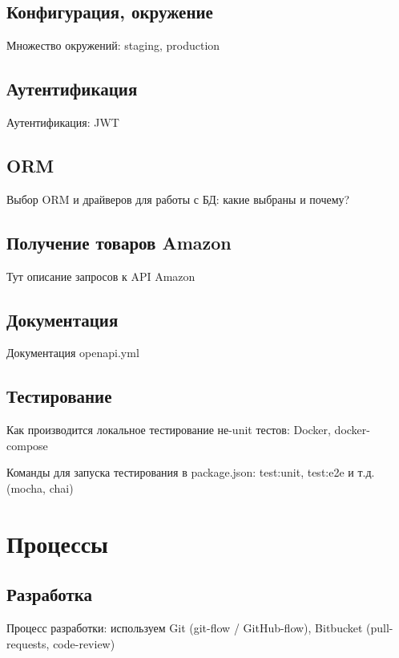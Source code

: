 \documentclass[times]{itmo-student-thesis}
\begin{document}
\subsection{Конфигурация, окружение}

Множество окружений: staging, production \cite{twelve-factor-app}


\subsection{Аутентификация}

Аутентификация: JWT


\subsection{ORM}

Выбор ORM и драйверов для работы с БД: какие выбраны и почему?

\subsection{Получение товаров Amazon}

Тут описание запросов к API Amazon

\subsection{Документация}

Документация openapi.yml


\subsection{Тестирование}

Как производится локальное тестирование не-unit тестов: Docker, docker-compose

Команды для запуска тестирования в package.json: test:unit, test:e2e и т.д. (mocha, chai)




\section{Процессы}

\subsection{Разработка}

Процесс разработки: используем Git (git-flow / GitHub-flow), Bitbucket (pull-requests, code-review)
\end{document}
